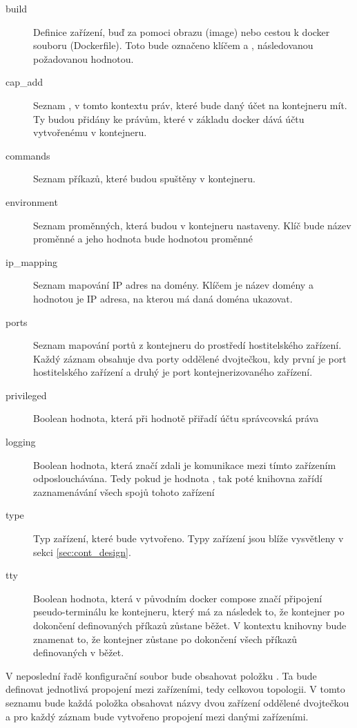 \begin{description}
    \item[build] Definice zařízení, buď za pomoci obrazu (image) nebo cestou k docker souboru (Dockerfile). Toto bude označeno klíčem  a , následovanou požadovanou hodnotou.
    \item[cap\_add] Seznam , v tomto kontextu práv, které bude daný účet na kontejneru mít. Ty budou přidány ke právům, které v základu docker dává účtu vytvořenému v kontejneru. 
    \item[commands] Seznam příkazů, které budou spuštěny v kontejneru.
    \item[environment] Seznam proměnných, která budou v kontejneru nastaveny. Klíč bude název proměnné a jeho hodnota bude hodnotou proměnné
    \item[ip\_mapping] Seznam mapování IP adres na domény. Klíčem je název domény a hodnotou je IP adresa, na kterou má daná doména ukazovat.
    \item[ports] Seznam mapování portů z kontejneru do prostředí hostitelského zařízení. Každý záznam obsahuje dva porty oddělené dvojtečkou, kdy první je port hostitelského zařízení a druhý je port kontejnerizovaného zařízení.
    \item[privileged] Boolean hodnota, která při hodnotě  přiřadí účtu správcovská práva
    \item[logging] Boolean hodnota, která značí zdali je komunikace mezi tímto zařízením odposlouchávána. Tedy pokud je hodnota , tak poté knihovna zařídí zaznamenávání všech spojů tohoto zařízení
    \item[type] Typ zařízení, které bude vytvořeno. Typy zařízení jsou blíže vysvětleny v sekci \ref{sec:cont_design}.
    \item[tty] Boolean hodnota, která v původním docker compose značí připojení pseudo-terminálu ke kontejneru, který má za následek to, že kontejner po dokončení definovaných příkazů zůstane běžet. V kontextu knihovny bude znamenat to, že kontejner zůstane po dokončení všech příkazů definovaných v  běžet. 
\end{description}

V neposlední řadě konfigurační soubor bude obsahovat položku . Ta bude definovat jednotlivá propojení mezi zařízeními, tedy celkovou topologii. V tomto seznamu bude každá položka obsahovat názvy dvou zařízení oddělené dvojtečkou a pro každý záznam bude vytvořeno propojení mezi danými zařízeními.

